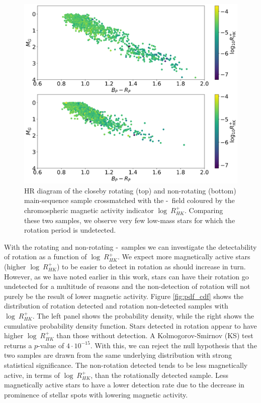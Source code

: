 \begin{figure}
\centering
  \includegraphics[width=\textwidth]{Figures/rot_gap_figures/HR_mag_and_non_rot.png}
  \caption[HR diagram of the closeby rotating (top) and non-rotating (bottom) main-sequence sample crossmatched with the \kepler-\lamost\ field coloured by the chromospheric magnetic activity indicator $\log \ R^{+}_{HK}$.]{
  HR diagram of the closeby rotating (top) and non-rotating (bottom) main-sequence sample crossmatched with the \kepler-\lamost\ field coloured by the chromospheric magnetic activity indicator $\log \ R^{+}_{HK}$.
  Comparing these two samples, we observe very few low-mass stars for which the rotation period is undetected.}
  \label{fig:non_rotating_mag_hr}
\end{figure}

With the rotating and non-rotating \kepler-\lamost\ samples we can investigate the detectability of rotation as a function of $\log \ R^{+}_{HK}$.
We expect more magnetically active stars (higher $\log \ R^{+}_{HK}$) to be easier to detect in rotation as \rper{} should increase in turn.
However, as we have noted earlier in this work, stars can have their rotation go undetected for a multitude of reasons and the non-detection of rotation will not purely be the result of lower magnetic activity.
Figure \ref{fig:pdf_cdf} shows the distribution of rotation detected and rotation non-detected samples with $\log \ R^{+}_{HK}$.
The left panel shows the probability density, while the right shows the cumulative probability density function.
Stars detected in rotation appear to have higher $\log \ R^{+}_{HK}$ than those without detection.
A Kolmogorov-Smirnov (KS) test returns a $p$-value of $4 \cdot10^{-15}$.
With this, we can reject the null hypothesis that the two samples are drawn from the same underlying distribution with strong statistical significance.
The non-rotation detected tends to be less magnetically active, in terms of $\log \ R^{+}_{HK}$, than the rotationally detected sample.
Less magnetically active stars to have a lower detection rate due to the decrease in prominence of stellar spots with lowering magnetic activity.

